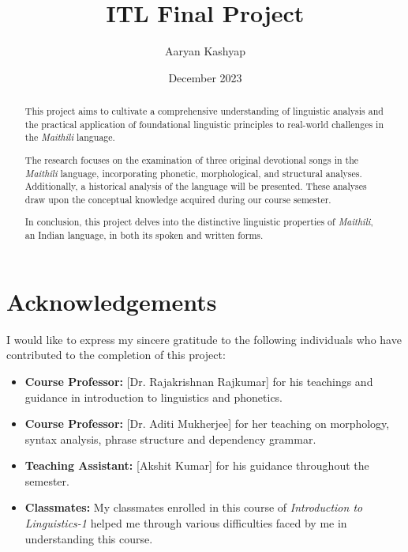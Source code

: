 \documentclass[17pt]{extarticle}
\title{\Large ITL Final Project}
\author{\Large Aaryan Kashyap}
\date{\Large December 2023}
\begin{document}
\maketitle

\begin{abstract}
    
\hspace*{0.5cm}This project aims to cultivate a comprehensive understanding of linguistic analysis and the practical application of foundational linguistic principles to real-world challenges in the \emph{Maithili} language.

The research focuses on the examination of three original devotional songs in the \emph{Maithili} language, incorporating phonetic, morphological, and structural analyses. Additionally, a historical analysis of the language will be presented. These analyses draw upon the conceptual knowledge acquired during our course semester.

In conclusion, this project delves into the distinctive linguistic properties of \emph{Maithili}, an Indian language, in both its spoken and written forms.

\end{abstract}

\section*{\textbf{Acknowledgements}}
I would like to express my sincere gratitude to the following individuals who have contributed to the completion of this project:
\begin{itemize}
  \item \textbf{Course Professor:} [Dr. Rajakrishnan Rajkumar] for his teachings and guidance in introduction to linguistics and phonetics.
  
  \item \textbf{Course Professor:} [Dr. Aditi Mukherjee] for her teaching on morphology, syntax analysis, phrase structure and dependency grammar.
  
  \item \textbf{Teaching Assistant:} [Akshit Kumar] for his guidance throughout the semester.
  
  \item \textbf{Classmates:} My classmates enrolled in this course of \emph{Introduction to Linguistics-1} helped me through various difficulties faced by me in understanding this course.
  
\end{itemize}
\end{document}
